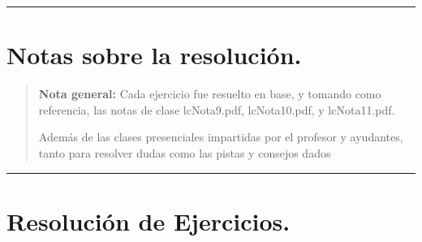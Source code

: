 \documentclass[12pt,letterpaper]{article}
\begin{document}
\bigskip
\hrule height 0.1pt
\bigskip

\section*{Notas sobre la resolución.}

\begin{quote}
  \textbf{Nota general:} Cada ejercicio fue resuelto en base, y tomando como referencia, las notas de clase lcNota9.pdf, lcNota10.pdf, y lcNota11.pdf.
  
  Adem\'{a}s de las clases presenciales impartidas por el profesor y ayudantes, tanto para resolver dudas como las pistas y consejos dados
\end{quote}

\bigskip
\hrule height 0.1pt
\bigskip

\newpage
\section*{Resolución de Ejercicios.}
\end{document}
